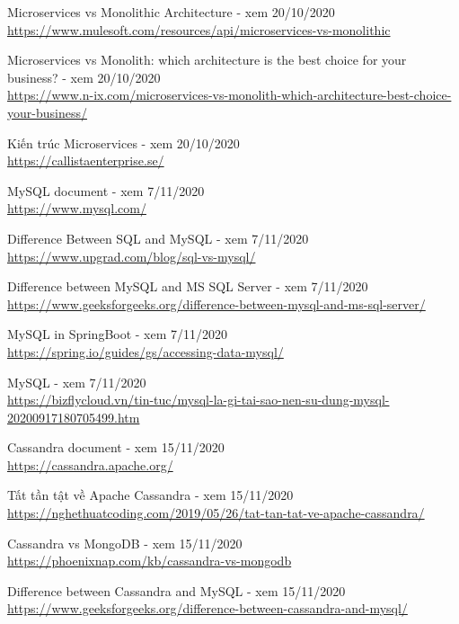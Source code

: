 \documentclass[12pt,a4paper,oneside]{book}
\begin{document}
\begin{thebibliography}{80}
        \bibitem{} Microservices vs Monolithic Architecture - xem 20/10/2020\\
        \url{https://www.mulesoft.com/resources/api/microservices-vs-monolithic}
        
        \bibitem{} Microservices vs Monolith: which architecture is the best choice for your business? - xem 20/10/2020\\
        \url{https://www.n-ix.com/microservices-vs-monolith-which-architecture-best-choice-your-business/}
        
        \bibitem{} Kiến trúc Microservices - xem 20/10/2020\\
        \url{https://callistaenterprise.se/}
        
        \bibitem{} MySQL document - xem 7/11/2020\\
        \url{https://www.mysql.com/}
        
        \bibitem{} Difference Between SQL and MySQL - xem 7/11/2020\\
        \url{https://www.upgrad.com/blog/sql-vs-mysql/}
        
        \bibitem{} Difference between MySQL and MS SQL Server - xem 7/11/2020\\
        \url{https://www.geeksforgeeks.org/difference-between-mysql-and-ms-sql-server/}
        
         \bibitem{} MySQL in SpringBoot - xem 7/11/2020\\
        \url{https://spring.io/guides/gs/accessing-data-mysql/}
        
        \bibitem{} MySQL - xem 7/11/2020\\
        \url{https://bizflycloud.vn/tin-tuc/mysql-la-gi-tai-sao-nen-su-dung-mysql-20200917180705499.htm}
        
        \bibitem{} Cassandra document - xem 15/11/2020\\
        \url{https://cassandra.apache.org/}
        
        \bibitem{} Tất tần tật về Apache Cassandra - xem 15/11/2020\\
        \url{https://nghethuatcoding.com/2019/05/26/tat-tan-tat-ve-apache-cassandra/}
        
        \bibitem{} Cassandra vs MongoDB - xem 15/11/2020\\
        \url{https://phoenixnap.com/kb/cassandra-vs-mongodb}
        
        \bibitem{} Difference between Cassandra and MySQL - xem 15/11/2020\\
        \url{https://www.geeksforgeeks.org/difference-between-cassandra-and-mysql/}
        

\end{thebibliography}
\end{document}
